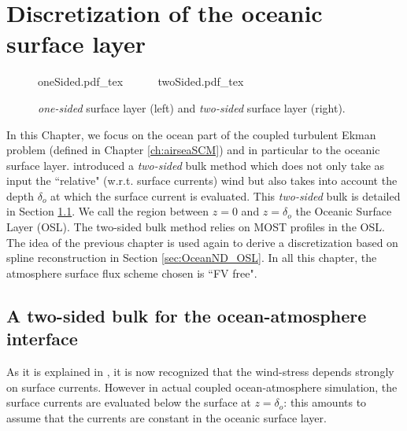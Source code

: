 \chapter{Discretization of the oceanic surface layer}
\label{ch:OceanND}
\minitoc
\begin{figure}
	\centering
	{oneSided.pdf_tex}
	~~~~~
	{twoSided.pdf_tex}
	\caption{\textit{one-sided} surface layer
	(left) and \textit{two-sided} surface layer (right).}
	\label{fig:OceanND_twoSidedBulk_drawing}
\end{figure}
In this Chapter, we focus on the ocean part of the coupled turbulent
Ekman problem (defined in Chapter \ref{ch:airseaSCM})
and in particular to the oceanic surface layer.
\citep{pelletier_two-sided_2021} introduced a \textit{two-sided}
bulk method which does not only take as input
the ``relative" (w.r.t. surface currents) wind but also takes into
account the depth $\delta_o$ at which the surface current
is evaluated.
This \textit{two-sided} bulk is detailed in Section
\ref{sec:OceanND_twoSidedBulk}.
We call the region between $z=0$ and
$z=\delta_o$ the Oceanic Surface Layer (OSL).
The two-sided bulk method relies on MOST profiles in the OSL.
The idea of the previous chapter is used again to
derive a discretization based on spline reconstruction
in Section \ref{sec:OceanND_OSL}.
In all this chapter, the atmosphere surface flux scheme chosen
is ``FV free".
\section{A two-sided bulk for the ocean-atmosphere interface}
\label{sec:OceanND_twoSidedBulk}
As it is explained in \citep{pelletier_two-sided_2021}, it is now
recognized that the wind-stress depends strongly on surface currents. 
However in actual coupled ocean-atmosphere simulation,
the surface currents are evaluated below the surface at $z=\delta_o$:
this amounts to assume that the currents are constant in the
oceanic surface layer.

